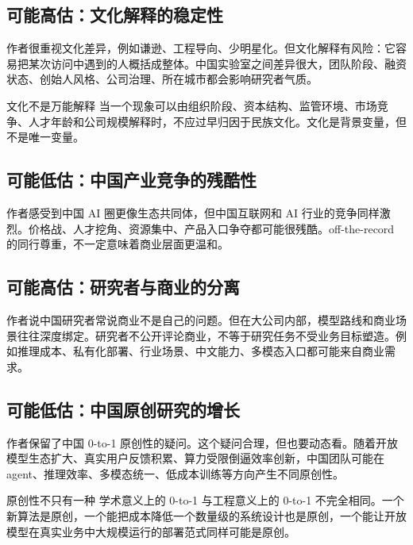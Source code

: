 \documentclass[a4paper]{article}
\begin{document}
\subsection{可能高估：文化解释的稳定性}

作者很重视文化差异，例如谦逊、工程导向、少明星化。但文化解释有风险：它容易把某次访问中遇到的人概括成整体。中国实验室之间差异很大，团队阶段、融资状态、创始人风格、公司治理、所在城市都会影响研究者气质。

\begin{warningbox}{文化不是万能解释}
当一个现象可以由组织阶段、资本结构、监管环境、市场竞争、人才年龄和公司规模解释时，不应过早归因于民族文化。文化是背景变量，但不是唯一变量。
\end{warningbox}

\subsection{可能低估：中国产业竞争的残酷性}

作者感受到中国 AI 圈更像生态共同体，但中国互联网和 AI 行业的竞争同样激烈。价格战、人才挖角、资源集中、产品入口争夺都可能很残酷。off-the-record 的同行尊重，不一定意味着商业层面更温和。

\subsection{可能高估：研究者与商业的分离}

作者说中国研究者常说商业不是自己的问题。但在大公司内部，模型路线和商业场景往往深度绑定。研究者不公开评论商业，不等于研究任务不受业务目标塑造。例如推理成本、私有化部署、行业场景、中文能力、多模态入口都可能来自商业需求。

\subsection{可能低估：中国原创研究的增长}

作者保留了中国 0-to-1 原创性的疑问。这个疑问合理，但也要动态看。随着开放模型生态扩大、真实用户反馈积累、算力受限倒逼效率创新，中国团队可能在 agent、推理效率、多模态统一、低成本训练等方向产生不同原创性。

\begin{knowledgebox}{原创性不只有一种}
学术意义上的 0-to-1 与工程意义上的 0-to-1 不完全相同。一个新算法是原创，一个能把成本降低一个数量级的系统设计也是原创，一个能让开放模型在真实业务中大规模运行的部署范式同样可能是原创。
\end{knowledgebox}
\end{document}
